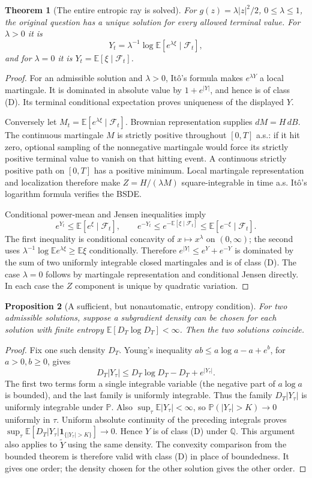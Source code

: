 \documentclass[11pt,a4paper]{article}
\newcommand{\E}{\mathbb E}
\newcommand{\Pp}{\mathbb P}
\newcommand{\Q}{\mathbb Q}
\newcommand{\F}{\mathcal F}
\newcommand{\ind}{\mathbf 1}
\newtheorem{theorem}{Theorem}
\newtheorem{proposition}[theorem]{Proposition}
\theoremstyle{definition}
\begin{document}
\begin{theorem}[The entire entropic ray is solved]
For $g(z)=\lambda|z|^2/2$, $0\le\lambda\le1$, the original question has a unique solution for every allowed terminal value. For $\lambda>0$ it is
\[
 Y_t=\lambda^{-1}\log\E[e^{\lambda\xi}\mid\F_t],
\]
and for $\lambda=0$ it is $Y_t=\E[\xi\mid\F_t]$.
\end{theorem}
\begin{proof}
For an admissible solution and $\lambda>0$, It\^o's formula makes $e^{\lambda Y}$ a local martingale. It is dominated in absolute value by $1+e^{|Y|}$, and hence is of class (D). Its terminal conditional expectation proves uniqueness of the displayed $Y$.

Conversely let $M_t=\E[e^{\lambda\xi}\mid\F_t]$. Brownian representation supplies $dM=H\,dB$. The continuous martingale $M$ is strictly positive throughout $[0,T]$ a.s.: if it hit zero, optional sampling of the nonnegative martingale would force its strictly positive terminal value to vanish on that hitting event. A continuous strictly positive path on $[0,T]$ has a positive minimum. Local martingale representation and localization therefore make $Z=H/(\lambda M)$ square-integrable in time a.s. It\^o's logarithm formula verifies the BSDE.

Conditional power-mean and Jensen inequalities imply
\[
 e^{Y_t}\le\E[e^\xi\mid\F_t],\qquad
 e^{-Y_t}\le e^{-\E[\xi\mid\F_t]}\le\E[e^{-\xi}\mid\F_t].
\]
The first inequality is conditional concavity of $x\mapsto x^\lambda$ on $(0,\infty)$; the second uses
$\lambda^{-1}\log\E e^{\lambda\xi}\ge\E\xi$ conditionally. Therefore $e^{|Y|}\le e^Y+e^{-Y}$ is dominated by the sum of two uniformly integrable closed martingales and is of class (D). The case $\lambda=0$ follows by martingale representation and conditional Jensen directly. In each case the $Z$ component is unique by quadratic variation.
\end{proof}

\begin{proposition}[A sufficient, but nonautomatic, entropy condition]
For two admissible solutions, suppose a subgradient density can be chosen for each solution with finite entropy $\E[D_T\log D_T]<\infty$. Then the two solutions coincide.
\end{proposition}
\begin{proof}
Fix one such density $D_T$. Young's inequality $ab\le a\log a-a+e^b$, for $a>0,b\ge0$, gives
\[
 D_T|Y_\tau|\le D_T\log D_T-D_T+e^{|Y_\tau|}.
\]
The first two terms form a single integrable variable (the negative part of $a\log a$ is bounded), and the last family is uniformly integrable. Thus the family $D_T|Y_\tau|$ is uniformly integrable under $\Pp$. Also $\sup_\tau\E|Y_\tau|<\infty$, so $\Pp(|Y_\tau|>K)\to0$ uniformly in $\tau$. Uniform absolute continuity of the preceding integrals proves
$\sup_\tau\E[D_T|Y_\tau|\ind_{\{|Y_\tau|>K\}}]\to0$.
Hence $Y$ is of class (D) under $\Q$. This argument also applies to $\widetilde Y$ using the same density. The convexity comparison from the bounded theorem is therefore valid with class (D) in place of boundedness. It gives one order; the density chosen for the other solution gives the other order.
\end{proof}
\end{document}
